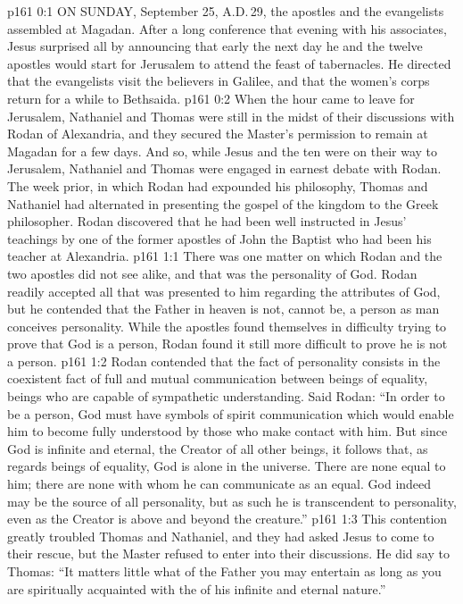 \vs p161 0:1 ON SUNDAY, September 25, A.D.\,29, the apostles and the evangelists assembled at Magadan. After a long conference that evening with his associates, Jesus surprised all by announcing that early the next day he and the twelve apostles would start for Jerusalem to attend the feast of tabernacles. He directed that the evangelists visit the believers in Galilee, and that the women’s corps return for a while to Bethsaida.
\vs p161 0:2 When the hour came to leave for Jerusalem, Nathaniel and Thomas were still in the midst of their discussions with Rodan of Alexandria, and they secured the Master’s permission to remain at Magadan for a few days. And so, while Jesus and the ten were on their way to Jerusalem, Nathaniel and Thomas were engaged in earnest debate with Rodan. The week prior, in which Rodan had expounded his philosophy, Thomas and Nathaniel had alternated in presenting the gospel of the kingdom to the Greek philosopher. Rodan discovered that he had been well instructed in Jesus’ teachings by one of the former apostles of John the Baptist who had been his teacher at Alexandria.
\vs p161 1:1 There was one matter on which Rodan and the two apostles did not see alike, and that was the personality of God. Rodan readily accepted all that was presented to him regarding the attributes of God, but he contended that the Father in heaven is not, cannot be, a person as man conceives personality. While the apostles found themselves in difficulty trying to prove that God is a person, Rodan found it still more difficult to prove he is not a person.
\vs p161 1:2 Rodan contended that the fact of personality consists in the coexistent fact of full and mutual communication between beings of equality, beings who are capable of sympathetic understanding. Said Rodan: “In order to be a person, God must have symbols of spirit communication which would enable him to become fully understood by those who make contact with him. But since God is infinite and eternal, the Creator of all other beings, it follows that, as regards beings of equality, God is alone in the universe. There are none equal to him; there are none with whom he can communicate as an equal. God indeed may be the source of all personality, but as such he is transcendent to personality, even as the Creator is above and beyond the creature.”
\vs p161 1:3 This contention greatly troubled Thomas and Nathaniel, and they had asked Jesus to come to their rescue, but the Master refused to enter into their discussions. He did say to Thomas: \textcolor{ubdarkred}{“It matters little what  of the Father you may entertain as long as you are spiritually acquainted with the  of his infinite and eternal nature.”}

